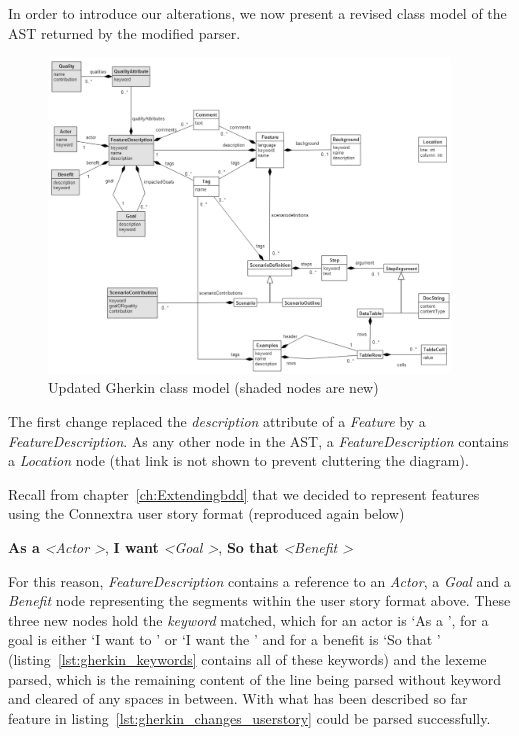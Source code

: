 \documentclass[dissertation,final]{softeng}
\begin{document}
In order to introduce our alterations, we now present a revised class model of the AST returned by the modified parser.

\begin{figure}[h!]
\includegraphics[width=0.95\textwidth]{gherkin_ast_new2}
\centering
\caption[Updated Gherkin class model]{Updated Gherkin class model (shaded nodes are new)}
\label{fig:gherkin_ast_new}
\end{figure}

The first change replaced the \emph{description} attribute of a \emph{Feature} by a \emph{FeatureDescription}. As any other node in the AST, a \emph{FeatureDescription} contains a \emph{Location} node (that link is not shown to prevent cluttering the diagram).

Recall from chapter~\ref{ch:Extendingbdd} that we decided to represent features using the Connextra user story format (reproduced again below)

\begin{displayquote}
\textbf{As a} \textit{\textless Actor \textgreater}, \textbf{I want} \textit{\textless Goal \textgreater}, \textbf{So that} \textit{\textless Benefit \textgreater}
\end{displayquote}

For this reason, \emph{FeatureDescription} contains a reference to an \emph{Actor}, a \emph{Goal} and a \emph{Benefit} node representing the segments within the user story format above. These three new nodes hold the \emph{keyword} matched, which for an actor is `As a ', for a goal is either `I want to ' or `I want the ' and for a benefit is `So that ' (listing~\ref{lst:gherkin_keywords} contains all of these keywords) and the lexeme parsed, which is the remaining content of the line being parsed without keyword and cleared of any spaces in between. With what has been described so far feature in listing~\ref{lst:gherkin_changes_userstory} could be parsed successfully.
\end{document}
